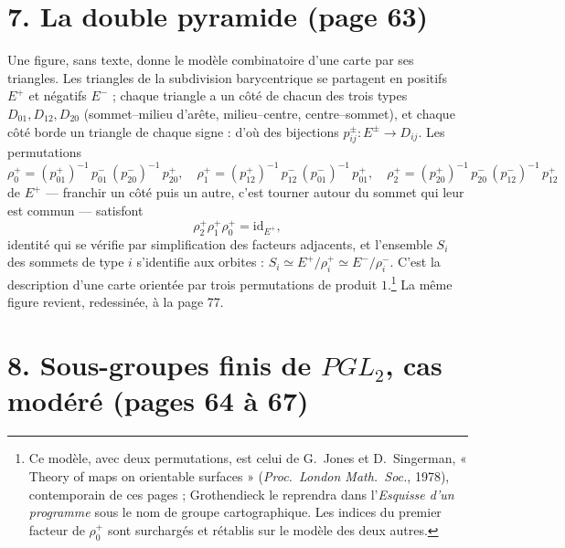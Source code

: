 \documentclass[11pt,a4paper]{article}
\begin{document}
\section*{7. La double pyramide (page 63)}

Une figure, sans texte, donne le modèle combinatoire d'une carte par ses
triangles. Les triangles de la subdivision barycentrique se partagent en
positifs $E^{+}$ et négatifs $E^{-}$ ; chaque triangle a un côté de chacun des
trois types $D_{01}, D_{12}, D_{20}$ (sommet--milieu d'arête, milieu--centre,
centre--sommet), et chaque côté borde un triangle de chaque signe : d'où des
bijections $p^{\pm}_{ij} : E^{\pm} \to D_{ij}$. Les permutations
\[
\rho_{0}^{+} = (p_{01}^{+})^{-1}\, p_{01}^{-}\, (p_{20}^{-})^{-1}\, p_{20}^{+},
\quad
\rho_{1}^{+} = (p_{12}^{+})^{-1}\, p_{12}^{-}\, (p_{01}^{-})^{-1}\, p_{01}^{+},
\quad
\rho_{2}^{+} = (p_{20}^{+})^{-1}\, p_{20}^{-}\, (p_{12}^{-})^{-1}\, p_{12}^{+}
\]
de $E^{+}$ --- franchir un côté puis un autre, c'est tourner autour du sommet
qui leur est commun --- satisfont
\[
\rho_{2}^{+}\rho_{1}^{+}\rho_{0}^{+} = \mathrm{id}_{E^{+}},
\]
identité qui se vérifie par simplification des facteurs adjacents, et
l'ensemble $S_{i}$ des sommets de type $i$ s'identifie aux orbites :
$S_{i} \simeq E^{+}/\rho_{i}^{+} \simeq E^{-}/\rho_{i}^{-}$. C'est la
description d'une carte orientée par trois permutations de produit
$1$.\footnote{Ce modèle, avec deux permutations, est celui de G.~Jones et
D.~Singerman, « Theory of maps on orientable surfaces » (\emph{Proc.\ London
Math.\ Soc.}, 1978), contemporain de ces pages ; Grothendieck le reprendra dans
l'\emph{Esquisse d'un programme} sous le nom de groupe cartographique. Les
indices du premier facteur de $\rho_{0}^{+}$ sont surchargés et rétablis sur le
modèle des deux autres.} La même figure revient, redessinée, à la page 77.

\section*{8. Sous-groupes finis de $PGL_{2}$, cas modéré (pages 64 à 67)}
\end{document}
